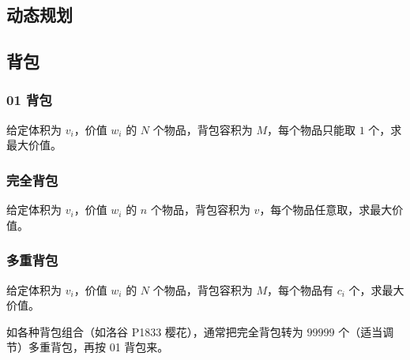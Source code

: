 \documentclass{probook}
\begin{document}
\begin{multicols}{2}

% 



% 







\chapter{动态规划}

\section{背包}

\subsection{01 背包}

给定体积为 $v_i$，价值 $w_i$ 的 $N$ 个物品，背包容积为 $M$，每个物品只能取 $1$ 个，求最大价值。



\subsection{完全背包}

给定体积为 $v_i$，价值 $w_i$ 的 $n$ 个物品，背包容积为 $v$，每个物品任意取，求最大价值。



\subsection{多重背包}

给定体积为 $v_i$，价值 $w_i$ 的 $N$ 个物品，背包容积为 $M$，每个物品有 $c_i$ 个，求最大价值。

如各种背包组合（如洛谷 P1833 樱花），通常把完全背包转为 $99999$ 个（适当调节）多重背包，再按 01 背包来。


\end{multicols}
\end{document}
